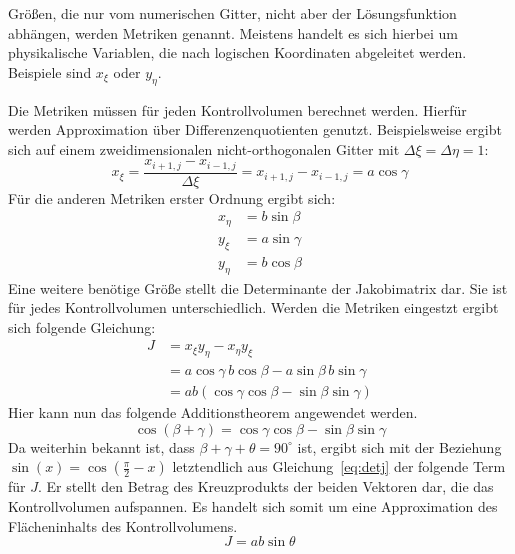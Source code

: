 Größen, die nur vom numerischen Gitter, nicht aber der Lösungsfunktion abhängen, werden Metriken genannt.
Meistens handelt es sich hierbei um physikalische Variablen, die nach logischen Koordinaten abgeleitet werden.
Beispiele sind $x_{\xi}$ oder $y_{\eta}$.

Die Metriken müssen für jeden Kontrollvolumen berechnet werden. Hierfür werden Approximation über
Differenzenquotienten genutzt\cite{Lee}. Beispielsweise ergibt sich auf einem zweidimensionalen nicht-orthogonalen
Gitter mit $\Delta\xi = \Delta \eta = 1$:
\begin{equation}
  x_{\xi} = \frac{x_{i+1, j} - x_{i-1,j}}{\Delta \xi} = x_{i+1, j} - x_{i-1,j} = a \cos \gamma
\end{equation}
Für die anderen Metriken erster Ordnung ergibt sich:
\begin{align*}
  x_{\eta} &= b\sin \beta\\
  y_{\xi} &= a \sin \gamma\\
  y_{\eta} &= b \cos \beta
\end{align*}
Eine weitere benötige Größe stellt die Determinante der Jakobimatrix
dar. Sie ist für jedes Kontrollvolumen unterschiedlich. Werden
die Metriken eingestzt ergibt sich folgende Gleichung:
\begin{align}
  J &= x_{\xi}y_{\eta}-x_{\eta}y_{\xi}\nonumber\\
    &= a \cos \gamma \, b \cos \beta - 
       a \sin \beta \, b \sin \gamma\nonumber\\
       &= ab(\cos\gamma\cos\beta-\sin\beta\sin\gamma) \label{eq:detj}
\end{align}
Hier kann nun das folgende Additionstheorem
angewendet werden.
\begin{equation*}
\cos(\beta+\gamma)=\cos\gamma\cos\beta-\sin\beta\sin\gamma
\end{equation*}
Da weiterhin bekannt ist, dass $\beta+\gamma
+\theta = 90^{\circ}$ ist, ergibt sich mit der Beziehung
$\sin(x)=\cos(\frac{\pi}{2} -x)$ letztendlich aus
Gleichung~\ref{eq:detj} der folgende Term für $J$. Er stellt den Betrag des
Kreuzprodukts der beiden
Vektoren dar,
die das Kontrollvolumen aufspannen.
Es handelt sich somit um eine Approximation des Flächeninhalts
des Kontrollvolumens.
\begin{equation}
  J = a b \sin \theta
\end{equation}
